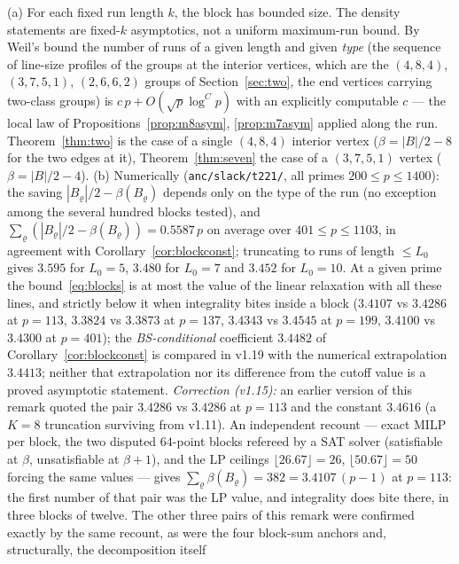\begin{remark}\label{rem:blocks}
(a) For each fixed run length $k$, the block has bounded size.  The density statements are fixed-$k$ asymptotics, not a uniform maximum-run bound.  By Weil's bound the number of runs of a given length and given \emph{type} (the sequence of line-size profiles of the groups at the
interior vertices, which are the $(4,8,4)$, $(3,7,5,1)$, $(2,6,6,2)$ groups of Section~\ref{sec:two}, the end vertices carrying two-class
groups) is $c\,p+O(\sqrt p\log^Cp)$ with an explicitly computable $c$ --- the local law of Propositions~\ref{prop:m8asym},
\ref{prop:m7asym} applied along the run.  Theorem~\ref{thm:two} is the case of a single $(4,8,4)$ interior vertex ($\beta=|B|/2-8$ for the
two edges at it), Theorem~\ref{thm:seven} the case of a $(3,7,5,1)$ vertex ($\beta=|B|/2-4$).
(b) Numerically (\texttt{anc/slack/t221/}, all primes $200\le p\le1400$): the saving $|B_\varrho|/2-\beta(B_\varrho)$ depends only on the type of the run
(no exception among the several hundred blocks tested), and $\sum_\varrho(|B_\varrho|/2-\beta(B_\varrho))=0.5587\,p$ on average over
$401\le p\le1103$, in agreement with Corollary~\ref{cor:blockconst}; truncating to runs of length $\le L_0$ gives
$3.595$ for $L_0=5$, $3.480$ for $L_0=7$ and $3.452$ for $L_0=10$.  At a given prime the bound~\eqref{eq:blocks} is at most the value of the linear relaxation with
all these lines, and strictly below it when integrality bites inside a block ($3.4107$ vs $3.4286$ at $p=113$, $3.3824$ vs $3.3873$ at
$p=137$, $3.4343$ vs $3.4545$ at $p=199$, $3.4100$ vs $3.4300$ at $p=401$); the \emph{BS-conditional} coefficient $3.4482$ of
Corollary~\ref{cor:blockconst} is compared in v1.19 with the numerical extrapolation $3.4413$; neither that extrapolation nor its difference from the cutoff value is a proved asymptotic statement.
\emph{Correction (v1.15):} an earlier version of this remark quoted the pair $3.4286$ vs $3.4286$ at $p=113$ and
the constant $3.4616$ (a $K=8$ truncation surviving from v1.11).  An independent recount --- exact MILP per block,
the two disputed $64$-point blocks refereed by a SAT solver (satisfiable at $\beta$, unsatisfiable at $\beta+1$),
and the LP ceilings $\lfloor26.67\rfloor=26$, $\lfloor50.67\rfloor=50$ forcing the same values --- gives
$\sum_\varrho\beta(B_\varrho)=382=3.4107\,(p-1)$ at $p=113$: the first number of that pair was the LP value, and
integrality does bite there, in three blocks of twelve.  The other three pairs of this remark were confirmed
exactly by the same recount, as were the four block-sum anchors and, structurally, the decomposition itself

\end{remark}
